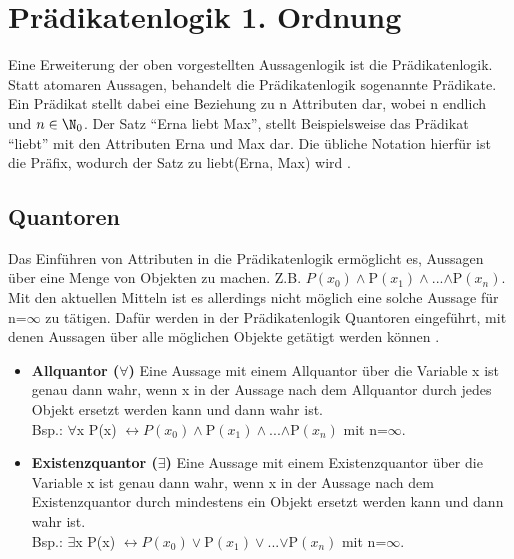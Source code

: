 \section{Prädikatenlogik 1. Ordnung}
Eine Erweiterung der oben vorgestellten Aussagenlogik ist die Prädikatenlogik. Statt atomaren Aussagen, behandelt die Prädikatenlogik sogenannte Prädikate. Ein Prädikat stellt dabei eine Beziehung zu n Attributen dar, wobei n endlich und $n\in\N_{0}$. Der Satz ``Erna liebt Max'', stellt Beispielsweise das Prädikat ``liebt'' mit den Attributen Erna und Max dar. Die übliche Notation hierfür ist die Präfix, wodurch der Satz zu liebt(Erna, Max) wird \cite{KB14}.

\subsection{Quantoren}
Das Einführen von Attributen in die Prädikatenlogik ermöglicht es, Aussagen über eine Menge von Objekten zu machen. Z.B. $P(x_{0})\wedge$P$(x_{1})\wedge$...$\wedge$P$(x_{n})$. Mit den aktuellen Mitteln ist es allerdings nicht möglich eine solche Aussage für n=$\infty$ zu tätigen. Dafür werden in der Prädikatenlogik Quantoren eingeführt, mit denen Aussagen über alle möglichen Objekte getätigt werden können \cite{KB14}.
\begin{itemize}
\item
\textbf{Allquantor ($\forall$)} Eine Aussage mit einem Allquantor über die Variable x ist genau dann wahr, wenn x in der Aussage nach dem Allquantor durch jedes Objekt ersetzt werden kann und dann wahr ist.\\
Bsp.: $\forall$x P(x) $\leftrightarrow P(x_{0})\wedge$P$(x_{1})\wedge$...$\wedge$P$(x_{n})$ mit n=$\infty$.

\item
\textbf{Existenzquantor ($\exists$)} Eine Aussage mit einem Existenzquantor über die Variable x ist genau dann wahr, wenn x in der Aussage nach dem Existenzquantor durch mindestens ein Objekt ersetzt werden kann und dann wahr ist.\\
Bsp.: $\exists$x P(x) $\leftrightarrow P(x_{0})\vee$P$(x_{1})\vee$...$\vee$P$(x_{n})$ mit n=$\infty$.
\end{itemize}

